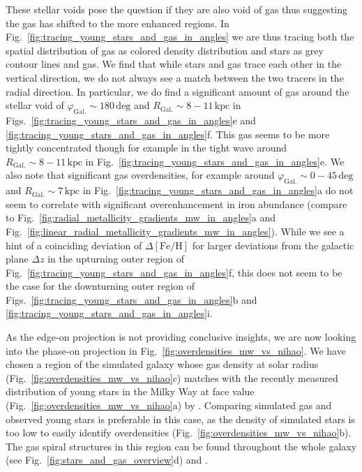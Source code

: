 \documentclass[fleqn,usenatbib]{mnras}
\begin{document}
These stellar voids pose the question if they are also void of gas thus suggesting the gas has shifted to the more enhanced regions. In Fig.~\ref{fig:tracing_young_stars_and_gas_in_angles} we are thus tracing both the spatial distribution of gas as colored density distribution and stars as grey contour lines and gas. We find that while stars and gas trace each other in the vertical direction, we do not always see a match between the two tracers in the radial direction. In particular, we do find a significant amount of gas around the stellar void of $\varphi_\mathrm{Gal.} \sim 180\,\mathrm{deg}$ and ${R_\mathrm{Gal.} \sim 8-11\,\mathrm{kpc}}$ in Figs.~\ref{fig:tracing_young_stars_and_gas_in_angles}e and \ref{fig:tracing_young_stars_and_gas_in_angles}f. This gas seems to be more tightly concentrated though for example in the tight wave around $R_\mathrm{Gal.} \sim 8-11\,\mathrm{kpc}$ in Fig.~\ref{fig:tracing_young_stars_and_gas_in_angles}e. We also note that significant gas overdensities, for example around $\varphi_\mathrm{Gal.} \sim 0-45\,\mathrm{deg}$ and $R_\mathrm{Gal.} \sim 7\,\mathrm{kpc}$ in Fig.~\ref{fig:tracing_young_stars_and_gas_in_angles}a do not seem to correlate with significant overenhancement in iron abundance (compare to Fig.~\ref{fig:radial_metallicity_gradients_mw_in_angles}a and Fig.~\ref{fig:linear_radial_metallicity_gradients_mw_in_angles}). While we see a hint of a coinciding deviation of $\Delta\mathrm{[Fe/H]}$ for larger deviations from the galactic plane $\Delta z$ in the upturning outer region of Fig.~\ref{fig:tracing_young_stars_and_gas_in_angles}f, this does not seem to be the case for the downturning outer region of Figs.~\ref{fig:tracing_young_stars_and_gas_in_angles}b and \ref{fig:tracing_young_stars_and_gas_in_angles}i.

As the edge-on projection is not providing conclusive insights, we are now looking into the phase-on projection in Fig.~\ref{fig:overdensities_mw_vs_nihao}. We have chosen a region of the simulated galaxy whose gas density at solar radius (Fig.~\ref{fig:overdensities_mw_vs_nihao}c) matches with the recently measured distribution of young stars in the Milky Way at face value (Fig.~\ref{fig:overdensities_mw_vs_nihao}a) by \citet{Poggio2021}. Comparing simulated gas and observed young stars is preferable in this case, as the density of simulated stars is too low to easily identify overdensities (Fig.~\ref{fig:overdensities_mw_vs_nihao}b). The gas spiral structures in this region can be found throughout the whole galaxy (see Fig.~\ref{fig:stars_and_gas_overview}d) and .
\end{document}
